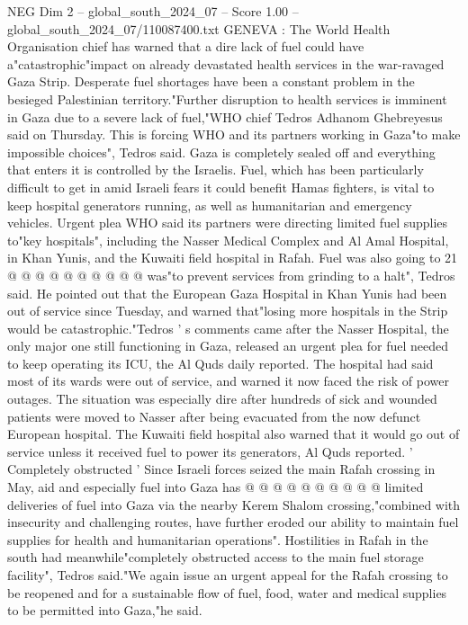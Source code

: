 \begin{textsample}{NEG Dim 2 – global\_south\_2024\_07 – Score 1.00 – global\_south\_2024\_07/110087400.txt}  \label{ex:f2_neg_380}
GENEVA : The World Health Organisation chief has warned that a dire lack of fuel could have a"catastrophic"impact on already devastated health services in the war-ravaged Gaza Strip.
Desperate fuel shortages have been a constant problem in the besieged Palestinian territory."Further disruption to health services is imminent in Gaza due to a severe lack of fuel,"WHO chief Tedros Adhanom Ghebreyesus said on Thursday.
This is forcing WHO and its partners working in Gaza"to make impossible choices", Tedros said.
Gaza is completely sealed off and everything that enters it is controlled by the Israelis.
Fuel, which has been particularly difficult to get in amid Israeli fears it could benefit Hamas fighters, is vital to keep hospital generators running, as well as humanitarian and emergency vehicles.
Urgent plea WHO said its partners were directing limited fuel supplies to"key hospitals", including the Nasser Medical Complex and Al Amal Hospital, in Khan Yunis, and the Kuwaiti field hospital in Rafah.
Fuel was also going to 21 @ @ @ @ @ @ @ @ @ @ was"to prevent services from grinding to a halt", Tedros said.
He pointed out that the European Gaza Hospital in Khan Yunis had been out of service since Tuesday, and warned that"losing more hospitals in the Strip would be catastrophic."Tedros ' s comments came after the Nasser Hospital, the only major one still functioning in Gaza, released an urgent plea for fuel needed to keep operating its ICU, the Al Quds daily reported.
The hospital had said most of its wards were out of service, and warned it now faced the risk of power outages.
The situation was especially dire after hundreds of sick and wounded patients were moved to Nasser after being evacuated from the now defunct European hospital.
The Kuwaiti field hospital also warned that it would go out of service unless it received fuel to power its generators, Al Quds reported. ' Completely obstructed ' Since Israeli forces seized the main Rafah crossing in May, aid and especially fuel into Gaza has @ @ @ @ @ @ @ @ @ @ limited deliveries of fuel into Gaza via the nearby Kerem Shalom crossing,"combined with insecurity and challenging routes, have further eroded our ability to maintain fuel supplies for health and humanitarian operations".
Hostilities in Rafah in the south had meanwhile"completely obstructed access to the main fuel storage facility", Tedros said."We again issue an urgent appeal for the Rafah crossing to be reopened and for a sustainable flow of fuel, food, water and medical supplies to be permitted into Gaza,"he said.

\end{textsample}
